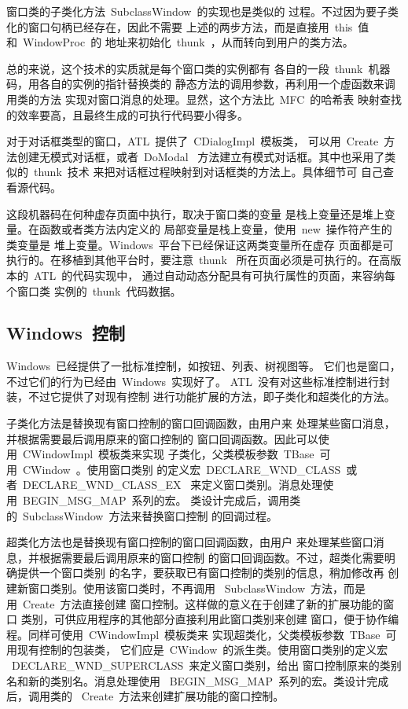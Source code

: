 窗口类的子类化方法~SubclassWindow~的实现也是类似的
过程。不过因为要子类化的窗口句柄已经存在，因此不需要
上述的两步方法，而是直接用~this~值和~WindowProc~的
地址来初始化~thunk~，从而转向到用户的类方法。

总的来说，这个技术的实质就是每个窗口类的实例都有
各自的一段~thunk~机器码，用各自的实例的指针替换类的
静态方法的调用参数，再利用一个虚函数来调用类的方法
实现对窗口消息的处理。显然，这个方法比~MFC~的哈希表
映射查找的效率要高，且最终生成的可执行代码要小得多。

对于对话框类型的窗口，ATL~提供了~CDialogImpl~模板类，
可以用~Create~方法创建无模式对话框，或者~DoModal~
方法建立有模式对话框。其中也采用了类似的~thunk~技术
来把对话框过程映射到对话框类的方法上。具体细节可
自己查看源代码。

这段机器码在何种虚存页面中执行，取决于窗口类的变量
是栈上变量还是堆上变量。在函数或者类方法内定义的
局部变量是栈上变量，使用~new~操作符产生的类变量是
堆上变量。Windows~平台下已经保证这两类变量所在虚存
页面都是可执行的。在移植到其他平台时，要注意~thunk~
所在页面必须是可执行的。在高版本的~ATL~的代码实现中，
通过自动动态分配具有可执行属性的页面，来容纳每个窗口类
实例的~thunk~代码数据。

\subsection{Windows~控制}

Windows~已经提供了一批标准控制，如按钮、列表、树视图等。
它们也是窗口，不过它们的行为已经由~Windows~实现好了。
ATL~没有对这些标准控制进行封装，不过它提供了对现有控制
进行功能扩展的方法，即子类化和超类化的方法。

子类化方法是替换现有窗口控制的窗口回调函数，由用户来
处理某些窗口消息，并根据需要最后调用原来的窗口控制的
窗口回调函数。因此可以使用~CWindowImpl~模板类来实现
子类化，父类模板参数~TBase~可用~CWindow~。使用窗口类别
的定义宏~DECLARE\_WND\_CLASS~或者~DECLARE\_WND\_CLASS\_EX~
来定义窗口类别。消息处理使用~BEGIN\_MSG\_MAP~系列的宏。
类设计完成后，调用类的~SubclassWindow~方法来替换窗口控制
的回调过程。

超类化方法也是替换现有窗口控制的窗口回调函数，由用户
来处理某些窗口消息，并根据需要最后调用原来的窗口控制
的窗口回调函数。不过，超类化需要明确提供一个窗口类别
的名字，要获取已有窗口控制的类别的信息，稍加修改再
创建新窗口类别。使用该窗口类时，不再调用
~SubclassWindow~方法，而是用~Create~方法直接创建
窗口控制。这样做的意义在于创建了新的扩展功能的窗口
类别，可供应用程序的其他部分直接利用此窗口类别来创建
窗口，便于协作编程。同样可使用~CWindowImpl~模板类来
实现超类化，父类模板参数~TBase~可用现有控制的包装类，
它们应是~CWindow~的派生类。使用窗口类别的定义宏
~DECLARE\_WND\_SUPERCLASS~来定义窗口类别，给出
窗口控制原来的类别名和新的类别名。消息处理使用
~BEGIN\_MSG\_MAP~系列的宏。类设计完成后，调用类的
~Create~方法来创建扩展功能的窗口控制。

